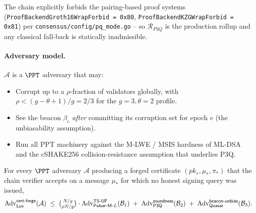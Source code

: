 The chain explicitly forbids the pairing-based proof systems
(\texttt{ProofBackendGroth16WrapForbid = 0x80},
\texttt{ProofBackendKZGWrapForbid = 0x81}) per
\texttt{consensus/config/pq\_mode.go} -- so $\mathcal{R}_{P3Q}$ is
the production rollup and any classical fall-back is statically
inadmissible.

\paragraph{Adversary model.}
$\mathcal{A}$ is a $\PPT$ adversary that may:
\begin{itemize}[leftmargin=*, itemsep=0pt]
\item Corrupt up to a $\rho$-fraction of validators globally, with
$\rho < (g - \theta + 1) / g = 2/3$ for the $g=3, \theta=2$ profile.
\item See the beacon $\beta_e$ \emph{after} committing its
corruption set for epoch $e$ (the unbiasability assumption).
\item Run all PPT machinery against the M-LWE / MSIS hardness of
ML-DSA and the cSHAKE256 collision-resistance assumption that
underlies P3Q.
\end{itemize}

\begin{theorem}
\label{thm:pulsar-m-grouped-sortition}
For every $\PPT$ adversary $\mathcal{A}$ producing a forged
certificate $(\mathit{pk}_*, \mu_*, \pi_*)$ that the chain verifier
accepts on a message $\mu_*$ for which no honest signing query was
issued,
\[
  \mathrm{Adv}^{\mathsf{cert\text{-}forge}}_{\mathsf{Lux}}(\mathcal{A})
  \;\le\;
  \tbinom{N/g}{\rho N / g} \cdot
  \mathrm{Adv}^{\mathsf{TS\text{-}UF}}_{\mathsf{Pulsar\text{-}M}\text{-}L}(\mathcal{B}_1)
  \;+\;
  \mathrm{Adv}^{\mathsf{soundness}}_{\mathsf{P3Q}}(\mathcal{B}_2)
  \;+\;
  \mathrm{Adv}^{\mathsf{beacon\text{-}unbias}}_{\mathsf{Quasar}}(\mathcal{B}_3).
\]
\end{theorem}

